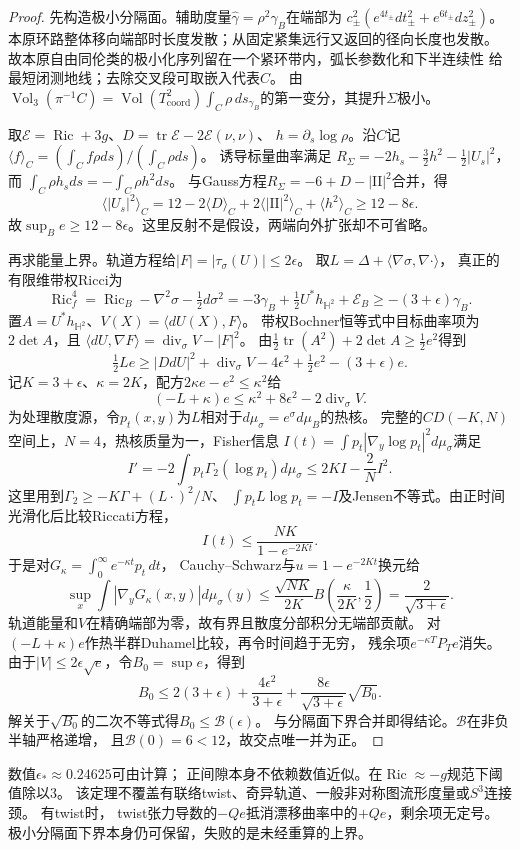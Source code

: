 \documentclass[UTF8,a4paper,11pt,fontset=fandol]{ctexart}
\numberwithin{equation}{section}
\theoremstyle{definition}
\newcommand{\Ric}{\operatorname{Ric}}
\newcommand{\Vol}{\operatorname{Vol}}
\newcommand{\tr}{\operatorname{tr}}
\begin{document}
\begin{proof}
先构造极小分隔面。辅助度量$\widehat\gamma=\rho^2\gamma_B$在端部为
$c_\pm^2(e^{4t_\pm}dt_\pm^2+e^{6t_\pm}dz_\pm^2)$。
本原环路整体移向端部时长度发散；从固定紧集远行又返回的径向长度也发散。
故本原自由同伦类的极小化序列留在一个紧环带内，弧长参数化和下半连续性
给最短闭测地线；去除交叉段可取嵌入代表$C$。
由
$\Vol_3(\pi^{-1}C)=\operatorname{Vol}(T^2_{\mathrm{coord}})
 \int_C\rho\,ds_{\gamma_B}$的第一变分，其提升$\Sigma$极小。

取$\mathcal E=\Ric+3g$、$D=\tr\mathcal E-2\mathcal E(\nu,\nu)$、
$h=\partial_s\log\rho$。沿$C$记
$\langle f\rangle_C=(\int_C f\rho ds)/(\int_C\rho ds)$。
诱导标量曲率满足
$R_\Sigma=-2h_s-\frac32h^2-\frac12|U_s|^2$，而
$\int_C\rho h_sds=-\int_C\rho h^2ds$。
与Gauss方程$R_\Sigma=-6+D-|\mathrm{II}|^2$合并，得
\[
 \langle |U_s|^2\rangle_C=12-2\langle D\rangle_C
 +2\langle|\mathrm{II}|^2\rangle_C+\langle h^2\rangle_C
 \ge12-8\epsilon.
\]
故$\sup_Be\ge12-8\epsilon$。这里反射不是假设，两端向外扩张却不可省略。

再求能量上界。轨道方程给$|F|=|\tau_\sigma(U)|\le2\epsilon$。
取$L=\Delta+\langle\nabla\sigma,\nabla\cdot\rangle$，
真正的有限维带权Ricci为
\[
 \Ric^4_f=\Ric_B-\nabla^2\sigma-\tfrac12d\sigma^2
 =-3\gamma_B+\tfrac12U^*h_{\mathbb H^2}+\mathcal E_B
 \ge-(3+\epsilon)\gamma_B.
\]
置$A=U^*h_{\mathbb H^2}$、$V(X)=\langle dU(X),F\rangle$。
带权Bochner恒等式中目标曲率项为$2\det A$，且
$\langle dU,\nabla F\rangle=\operatorname{div}_\sigma V-|F|^2$。
由$\frac12\tr(A^2)+2\det A\ge\frac12e^2$得到
\[
 \tfrac12Le\ge |DdU|^2+\operatorname{div}_\sigma V
   -4\epsilon^2+\tfrac12e^2-(3+\epsilon)e.
\]
记$K=3+\epsilon$、$\kappa=2K$，配方$2\kappa e-e^2\le\kappa^2$给
\[
 (-L+\kappa)e\le\kappa^2+8\epsilon^2
                 -2\operatorname{div}_\sigma V.
\]
为处理散度源，令$p_t(x,y)$为$L$相对于$d\mu_\sigma=e^\sigma d\mu_B$的热核。
完整的$CD(-K,N)$空间上，$N=4$，热核质量为一，Fisher信息
$I(t)=\int p_t|\nabla_y\log p_t|^2d\mu_\sigma$满足
\[
 I'=-2\int p_t\Gamma_2(\log p_t)d\mu_\sigma
 \le2KI-\frac2N I^2.
\]
这里用到$\Gamma_2\ge-K\Gamma+(L\cdot)^2/N$、
$\int p_tL\log p_t=-I$及Jensen不等式。由正时间光滑化后比较Riccati方程，
\[
 I(t)\le\frac{NK}{1-e^{-2Kt}}.
\]
于是对$G_\kappa=\int_0^\infty e^{-\kappa t}p_t\,dt$，
Cauchy--Schwarz与$u=1-e^{-2Kt}$换元给
\[
 \sup_x\int|\nabla_yG_\kappa(x,y)|d\mu_\sigma(y)
 \le\frac{\sqrt{NK}}{2K}
       B\!\left(\frac{\kappa}{2K},\frac12\right)
 =\frac2{\sqrt{3+\epsilon}}.
\]
轨道能量和$V$在精确端部为零，故有界且散度分部积分无端部贡献。
对$(-L+\kappa)e$作热半群Duhamel比较，再令时间趋于无穷，
残余项$e^{-\kappa T}P_Te$消失。由于$|V|\le2\epsilon\sqrt e$，令$B_0=\sup e$，得到
\[
 B_0\le2(3+\epsilon)+\frac{4\epsilon^2}{3+\epsilon}
            +\frac{8\epsilon}{\sqrt{3+\epsilon}}\sqrt{B_0}.
\]
解关于$\sqrt{B_0}$的二次不等式得$B_0\le\mathcal B(\epsilon)$。
与分隔面下界合并即得结论。$\mathcal B$在非负半轴严格递增，
且$\mathcal B(0)=6<12$，故交点唯一并为正。
\end{proof}
数值$\epsilon_*\approx0.24625$可由计算；
正间隙本身不依赖数值近似。在$\Ric\approx-g$规范下阈值除以3。
该定理不覆盖有联络twist、奇异轨道、一般非对称图流形度量或$S^3$连接颈。
有twist时，
twist张力导数的$-Qe$抵消漂移曲率中的$+Qe$，剩余项无定号。
极小分隔面下界本身仍可保留，失败的是未经重算的上界。
\end{document}
